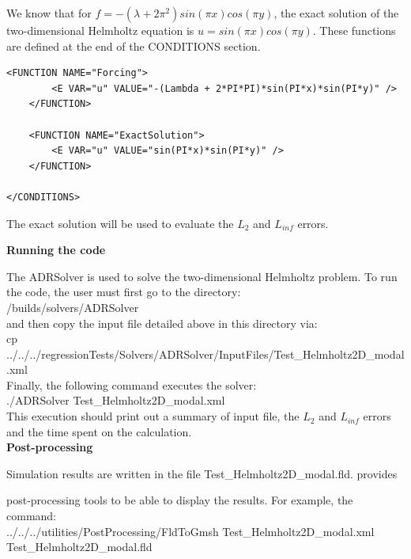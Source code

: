 We know that for $f = -(\lambda + 2 \pi^2)sin(\pi x)cos(\pi y)$, the exact solution of the two-dimensional 
Helmholtz equation is $u = sin(\pi x)cos(\pi y)$. These functions are defined at the end of the CONDITIONS section.

\begin{lstlisting}[style=XMLStyle]
<FUNCTION NAME="Forcing">
        <E VAR="u" VALUE="-(Lambda + 2*PI*PI)*sin(PI*x)*sin(PI*y)" />
    </FUNCTION>

    <FUNCTION NAME="ExactSolution">
        <E VAR="u" VALUE="sin(PI*x)*sin(PI*y)" />
    </FUNCTION>

</CONDITIONS>
\end{lstlisting}

The exact solution will be used to evaluate the $L_2$ and $L_{inf}$ errors.

\textbf{Running the code}

The ADRSolver is used to solve the two-dimensional Helmholtz problem. To run the code, the user must first go to the directory: \\

\nekpp/builds/solvers/ADRSolver \\ 

and then copy the input file detailed above in this directory via: \\

cp ../../../regressionTests/Solvers/ADRSolver/InputFiles/Test\_Helmholtz2D\_modal.xml \\

Finally, the following command executes the solver: \\

./ADRSolver Test\_Helmholtz2D\_modal.xml \\

This execution should print out a summary of input file, the $L_2$ and $L_{inf}$ errors and the time spent on the calculation.\\

\textbf{Post-processing}

Simulation results are written in the file Test\_Helmholtz2D\_modal.fld. \nekpp provides

 post-processing tools to be able to display the results. For example, the command:\\
 
\footnotesize../../../utilities/PostProcessing/FldToGmsh Test\_Helmholtz2D\_modal.xml Test\_Helmholtz2D\_modal.fld \\
 
